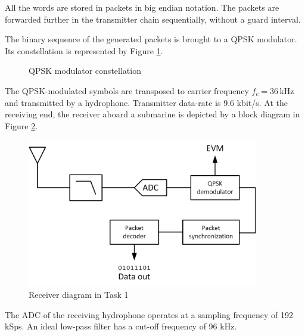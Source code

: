\documentclass{article}
\begin{document}
All the words are stored in packets in big endian notation. The packets are forwarded further in the transmitter chain sequentially, without a guard interval.

The binary sequence of the generated packets is brought to a QPSK modulator. Its constellation is represented by Figure \ref{fig:qpsk}.

\begin{figure}[h!]
\centering
{}
\caption{QPSK modulator constellation}
\label{fig:qpsk}
\end{figure}

The QPSK-modulated symbols are transposed to carrier frequency $f_c = 36 \,\textrm{kHz}$ and transmitted by a hydrophone. Transmitter data-rate is 9.6 kbit/s. At the receiving end, the receiver aboard a submarine is depicted by a block diagram in Figure \ref{fig:task1}.

\begin{figure}[h!]
\centering
\includegraphics[width=0.9\textwidth]{Images/Task1.png}
\caption{Receiver diagram in Task 1}
\label{fig:task1}
\end{figure}

The ADC of the receiving hydrophone operates at a sampling frequency of 192 kSps. An ideal low-pass filter has a cut-off frequency of 96 kHz.
\end{document}
